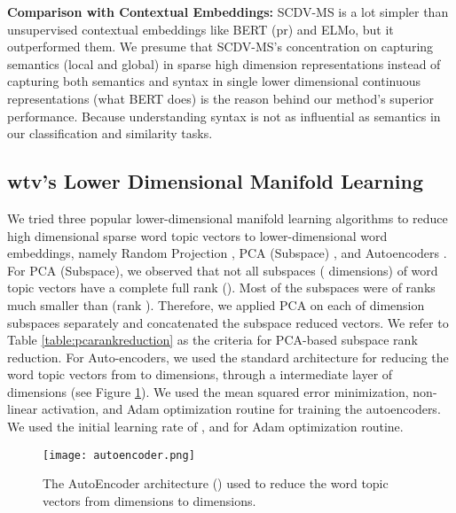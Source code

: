 \documentclass{ecai}
\begin{document}
\vspace{0.5em}
\noindent \textbf{Comparison with Contextual Embeddings: } SCDV-MS is a lot simpler than unsupervised contextual embeddings like BERT (pr) and ELMo, but it outperformed them. We presume that SCDV-MS's concentration on capturing semantics (local and global) in sparse high dimension representations instead of capturing both semantics and syntax in single lower dimensional continuous representations (what BERT does) is the reason behind our method's superior performance. Because understanding syntax is not as influential as semantics in our classification and similarity tasks.

\subsection{wtv's Lower Dimensional Manifold Learning}
\label{subsec:dimreduction}
We tried three popular lower-dimensional manifold learning algorithms to reduce high dimensional sparse word topic vectors to lower-dimensional word embeddings, namely Random Projection \cite{achlioptas2003database}, PCA (Subspace) \cite{abdi2010principal}, and Autoencoders  \cite{vincent2010stacked}. For PCA (Subspace), we observed that not all subspaces ( dimensions) of word topic vectors have a complete full rank (). Most of the subspaces were of ranks much smaller than  (rank  ). Therefore, we applied PCA on each of  dimension subspaces separately and concatenated the subspace reduced vectors. We refer to Table \ref{table:pcarankreduction} as the criteria for PCA-based subspace rank reduction. For Auto-encoders, we used the standard architecture for reducing the word topic vectors from  to  dimensions, through a intermediate layer of  dimensions (see Figure \ref{fig:ourautoarch}). We used the mean squared error minimization,  non-linear activation, and Adam optimization routine for training the autoencoders. We used the initial learning rate of ,  and  for Adam optimization routine. 
\begin{figure}
\vspace{-0.5em}
\captionsetup{font=small, skip=0.0pt}
\centering
\texttt{[image: autoencoder.png]}
\vspace{1.0em}
\caption{The AutoEncoder architecture () used to reduce the word topic vectors from  dimensions to  dimensions. }
\label{fig:ourautoarch}
\vspace{-1.5em}
\end{figure}
\end{document}
